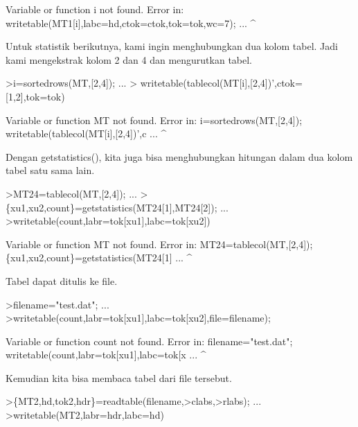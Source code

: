 \documentclass[a4paper,10pt]{article}
\begin{document}
\begin{eulernotebook}
\begin{eulercomment}
\begin{eulercomment}
\begin{eulercomment}
\begin{eulercomment}
\begin{eulercomment}
\begin{eulercomment}
\begin{eulercomment}
\begin{eulercomment}
\begin{eulercomment}
\begin{eulercomment}
\begin{eulercomment}
\begin{eulercomment}
\begin{eulercomment}
\begin{eulercomment}
\begin{eulercomment}
\begin{eulercomment}
\begin{eulercomment}
\begin{eulercomment}
\begin{euleroutput}
  Variable or function i not found.
  Error in:
  writetable(MT1[i],labc=hd,ctok=ctok,tok=tok,wc=7); ...
                  ^
\end{euleroutput}
\begin{eulercomment}
Untuk statistik berikutnya, kami ingin menghubungkan dua kolom tabel.
Jadi kami mengekstrak kolom 2 dan 4 dan mengurutkan tabel.
\end{eulercomment}
\begin{eulerprompt}
>i=sortedrows(MT,[2,4]);  ...
>  writetable(tablecol(MT[i],[2,4])',ctok=[1,2],tok=tok)
\end{eulerprompt}
\begin{euleroutput}
  Variable or function MT not found.
  Error in:
  i=sortedrows(MT,[2,4]);    writetable(tablecol(MT[i],[2,4])',c ...
                 ^
\end{euleroutput}
\begin{eulercomment}
Dengan getstatistics(), kita juga bisa menghubungkan hitungan dalam
dua kolom tabel satu sama lain.
\end{eulercomment}
\begin{eulerprompt}
>MT24=tablecol(MT,[2,4]); ...
>\{xu1,xu2,count\}=getstatistics(MT24[1],MT24[2]); ...
>writetable(count,labr=tok[xu1],labc=tok[xu2])
\end{eulerprompt}
\begin{euleroutput}
  Variable or function MT not found.
  Error in:
  MT24=tablecol(MT,[2,4]); \{xu1,xu2,count\}=getstatistics(MT24[1] ...
                  ^
\end{euleroutput}
\begin{eulercomment}
Tabel dapat ditulis ke file.
\end{eulercomment}
\begin{eulerprompt}
>filename="test.dat"; ...
>writetable(count,labr=tok[xu1],labc=tok[xu2],file=filename);
\end{eulerprompt}
\begin{euleroutput}
  Variable or function count not found.
  Error in:
  filename="test.dat"; writetable(count,labr=tok[xu1],labc=tok[x ...
                                       ^
\end{euleroutput}
\begin{eulercomment}
Kemudian kita bisa membaca tabel dari file tersebut.
\end{eulercomment}
\begin{eulerprompt}
>\{MT2,hd,tok2,hdr\}=readtable(filename,>clabs,>rlabs); ...
>writetable(MT2,labr=hdr,labc=hd)

\end{eulerprompt}
\end{eulercomment}
\end{eulercomment}
\end{eulercomment}
\end{eulercomment}
\end{eulercomment}
\end{eulercomment}
\end{eulercomment}
\end{eulercomment}
\end{eulercomment}
\end{eulercomment}
\end{eulercomment}
\end{eulercomment}
\end{eulercomment}
\end{eulercomment}
\end{eulercomment}
\end{eulercomment}
\end{eulercomment}
\end{eulercomment}
\end{eulernotebook}
\end{document}
